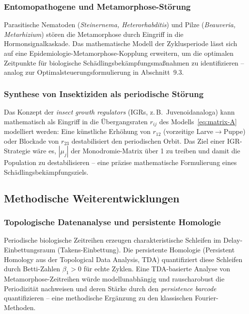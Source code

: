 ﻿\documentclass[12pt, a4paper]{article}
\theoremstyle{definition}
\begin{document}
\subsubsection{Entomopathogene und Metamorphose-Störung}
Parasitische Nematoden (\emph{Steinernema, Heterorhabditis}) und Pilze
(\emph{Beauveria, Metarhizium}) stören die Metamorphose durch Eingriff in die
Hormonsignalkaskade. Das mathematische Modell der Zyklusperiode lässt sich auf
eine Epidemiologie-Metamorphose-Kopplung erweitern, um die optimalen Zeitpunkte
für biologische Schädlingsbekämpfungsmaßnahmen zu identifizieren -- analog zur
Optimalsteuerungsformulierung in Abschnitt~9.3.

\subsubsection{Synthese von Insektiziden als periodische Störung}
Das Konzept der \emph{insect growth regulators} (IGRs, z.\,B.\ Juvenoidanaloga)
kann mathematisch als Eingriff in die Übergangsraten $r_{ij}$ des Modells~\eqref{eq:matrix-A}
modelliert werden: Eine künstliche Erhöhung von $r_{12}$ (vorzeitige Larve$\to$Puppe)
oder Blockade von $r_{23}$ destabilisiert den periodischen Orbit. Das Ziel einer
IGR-Strategie wäre es, $|\mu_j|$ der Monodromie-Matrix über 1 zu treiben und
damit die Population zu destabilisieren -- eine präzise mathematische Formulierung
eines Schädlingsbekämpfungsziels.

\subsection{Methodische Weiterentwicklungen}

\subsubsection{Topologische Datenanalyse und persistente Homologie}
Periodische biologische Zeitreihen erzeugen charakteristische Schleifen im
Delay-Einbet\-tungsraum (Takens-Einbettung). Die persistente Homologie (Persistent
Homology aus der Topological Data Analysis, TDA) quantifiziert diese Schleifen
durch Betti-Zahlen $\beta_1 > 0$ für echte Zyklen. Eine TDA-basierte Analyse
von Metamorphose-Zeitreihen würde modellunabhängig und rauscharobust die
Periodizität nachweisen und deren Stärke durch den \emph{persistence barcode}
quantifizieren -- eine methodische Ergänzung zu den klassischen Fourier-Methoden.
\end{document}
